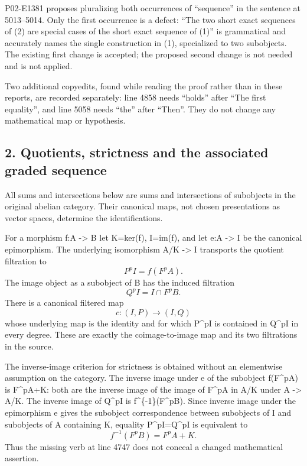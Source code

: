 \documentclass[11pt]{article}
\begin{document}
P02-E1381 proposes pluralizing both occurrences of ``sequence'' in the sentence at 5013--5014. Only the first occurrence is a defect: ``The two short exact sequences of (2) are special cases of the short exact sequence of (1)'' is grammatical and accurately names the single construction in (1), specialized to two subobjects. The existing first change is accepted; the proposed second change is not needed and is not applied.

Two additional copyedits, found while reading the proof rather than in these reports, are recorded separately: line 4858 needs ``holds'' after ``The first equality'', and line 5058 needs ``the'' after ``Then''. They do not change any mathematical map or hypothesis.

\subsection{2. Quotients, strictness and the associated graded sequence}\label{note-05-quotients-strictness-and-the-associated-graded-sequence}

All sums and intersections below are sums and intersections of subobjects in the original abelian category. Their canonical maps, not chosen presentations as vector spaces, determine the identifications.

For a morphism f:A -\textgreater{} B let K=ker(f), I=im(f), and let e:A -\textgreater{} I be the canonical epimorphism. The underlying isomorphism A/K -\textgreater{} I transports the quotient filtration to \[
P^pI=f(F^pA).
\] The image object as a subobject of B has the induced filtration \[
Q^pI=I\cap F^pB.
\] There is a canonical filtered map \[
c:(I,P)\longrightarrow(I,Q)
\] whose underlying map is the identity and for which P\^{}pI is contained in Q\^{}pI in every degree. These are exactly the coimage-to-image map and its two filtrations in the source.

The inverse-image criterion for strictness is obtained without an elementwise assumption on the category. The inverse image under e of the subobject f(F\^{}pA) is F\^{}pA+K: both are the inverse image of the image of F\^{}pA in A/K under A -\textgreater{} A/K. The inverse image of Q\^{}pI is f\^{}\{-1\}(F\^{}pB). Since inverse image under the epimorphism e gives the subobject correspondence between subobjects of I and subobjects of A containing K, equality P\^{}pI=Q\^{}pI is equivalent to \[
f^{-1}(F^pB)=F^pA+K.                                      \tag{2.1}
\] Thus the missing verb at line 4747 does not conceal a changed mathematical assertion.
\end{document}
